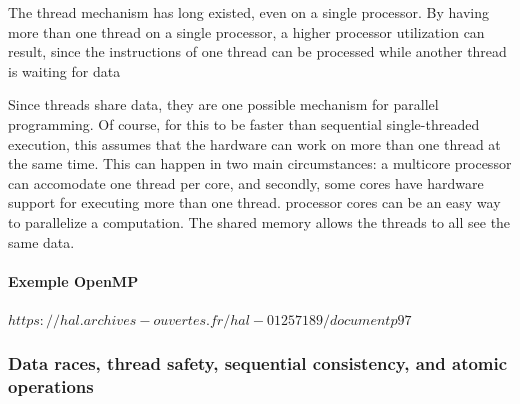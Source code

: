 The thread mechanism has long existed, even on a single processor. By having more than one thread on
a single processor, a higher processor utilization can result, since the instructions of one thread can be
processed while another thread is waiting for data

Since threads share data, they are one possible mechanism for parallel programming. Of course, for this to be faster than sequential single-threaded execution, this assumes that the hardware can work on more than one thread at the same time. This can happen in two main circumstances: a multicore processor can accomodate one thread per core, and secondly, some cores have hardware support for executing more than one thread.  processor cores can be an easy way to parallelize a
computation. The shared memory allows the threads to all see the same data.

\paragraph{Exemple OpenMP}
$https://hal.archives-ouvertes.fr/hal-01257189/document p97$



\subsubsection{Data races, thread safety, sequential consistency, and atomic operations }









